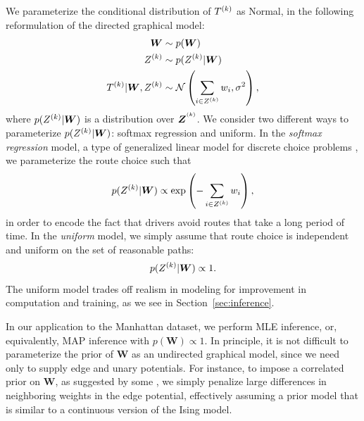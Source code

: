 \documentclass{article}
\begin{document}
We parameterize the conditional distribution of $T^{(k)}$ as Normal, in the following reformulation of the directed graphical model: \begin{align*}
\bm W &\sim p(\bm W) \\
Z^{(k)} &\sim p(Z^{(k)} | \bm W) \\
T^{(k)} | \bm W, Z^{(k)} &\sim \mathcal{N}\left({\sum_{i\in Z^{(k)}} w_i, \sigma^2}\right),
\end{align*}
where $p(Z^{(k)} | \bm W)$ is a distribution over $\bm Z^{^{(k)}}$. We consider two different ways to parameterize $p(Z^{(k)} | \bm W)$: softmax regression and uniform. In the \emph{softmax regression} model, a type of generalized linear model for discrete choice problems \cite{mcfadden1973conditional}, we parameterize the route choice such that \[
p(Z^{(k)}|\bm W) \propto \exp\left({-\sum_{i\in Z^{(k)}}w_i}\right),
\]
in order to encode the fact that drivers avoid routes that take a long period of time. In the \emph{uniform} model, we simply assume that route choice is independent and uniform on the set of reasonable paths: \[
p(Z^{(k)}|\bm W) \propto 1.
\]
The uniform model trades off realism in modeling for improvement in computation and training, as we see in Section~\ref{sec:inference}.

In our application to the Manhattan dataset, we perform MLE inference, or, equivalently, MAP inference with $p(\bm W) \propto 1$. In principle, it is not difficult to parameterize the prior of $\bm W$ as an undirected graphical model, since we need only to supply edge and unary potentials. For instance, to impose a correlated prior on $\bm W$, as suggested by some \cite{hunter2009path}, we simply penalize large differences in neighboring weights in the edge potential, effectively assuming a prior model that is similar to a continuous version of the Ising model. 



% 
% 
% 
\end{document}
